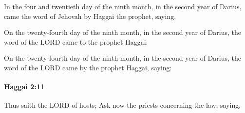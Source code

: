 			\begin{versebox}
					\item[BHS] 
					\item[LXX] 
					\item[ASV] In the four and twentieth day of the ninth month, in the second year of Darius, came the word of Jehovah by Haggai the prophet, saying,
					\item[NIV] On the twenty-fourth day of the ninth month, in the second year of Darius, the word of the LORD came to the prophet Haggai:
					\item[NRSV] On the twenty-fourth day of the ninth month, in the second year of Darius, the word of the LORD came by the prophet Haggai, saying:
			\end{versebox}

		\paragraph{Haggai 2:11} %
			\label{HAGGAI-2-11}

			Thus saith the LORD of hosts; Ask now the priests concerning the law, saying,

